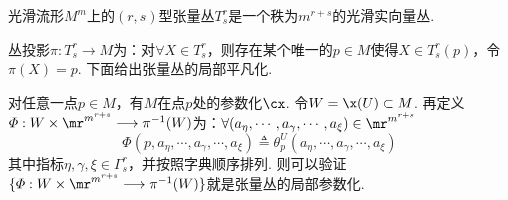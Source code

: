 \begin{example}
	\label{chapter2张量丛是向量丛}
    光滑流形$M^{m}$上的$(r,s)$型张量丛$T^{r}_{s}$是一个秩为$m^{r+s}$的光滑实向量丛.
    \soln
    
    丛投影$\pi:T^{r}_{s}\longrightarrow M$为：对$\forall X\in T^{r}_{s}$，则存在某个唯一的$p\in M$使得$X\in T^{r}_{s}(p)$，令$\pi(X)=p$. 下面给出张量丛的局部平凡化.
    
    对任意一点$p\in M$，有$M$在点$p$处的参数化$\cx$. 令$W=\x(U)\subset M$. 再定义$\varPhi:W\times \mr^{m^{r+s}}\longrightarrow \pi^{-1}(W)$为：$\forall (a_{\eta},\cdots,a_{\gamma},\cdots,a_{\xi})\in \mr^{m^{r+s}}$
    \[
    \varPhi(p,a_{\eta},\cdots,a_{\gamma},\cdots,a_{\xi})\triangleq \theta^{U}_{p}(a_{\eta},\cdots,a_{\gamma},\cdots,a_{\xi})
    \]
    其中指标$\eta,\gamma,\xi\in \Gamma^{r}_{s}$，并按照字典顺序排列. 则可以验证$\{\varPhi:W\times \mr^{m^{r+s}}\longrightarrow \pi^{-1}(W) \}$就是张量丛的局部参数化.
\end{example}

